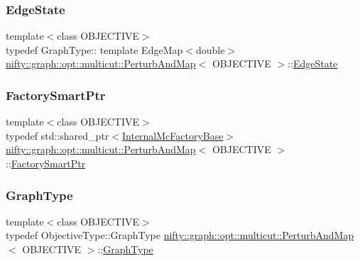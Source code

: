 \subsubsection{\texorpdfstring{Edge\+State}{EdgeState}}
{\footnotesize\ttfamily template$<$class O\+B\+J\+E\+C\+T\+I\+VE$>$ \\
typedef Graph\+Type\+:: template Edge\+Map$<$double$>$ \hyperlink{classnifty_1_1graph_1_1opt_1_1multicut_1_1PerturbAndMap}{nifty\+::graph\+::opt\+::multicut\+::\+Perturb\+And\+Map}$<$ O\+B\+J\+E\+C\+T\+I\+VE $>$\+::\hyperlink{classnifty_1_1graph_1_1opt_1_1multicut_1_1PerturbAndMap_a82a5b6a74aac0c8bc47d5ccfbd06aaf2}{Edge\+State}}

\mbox{\label{classnifty_1_1graph_1_1opt_1_1multicut_1_1PerturbAndMap_ac2849f0d5d528fb07bf62f213bee8551}} 
\subsubsection{\texorpdfstring{Factory\+Smart\+Ptr}{FactorySmartPtr}}
{\footnotesize\ttfamily template$<$class O\+B\+J\+E\+C\+T\+I\+VE$>$ \\
typedef std\+::shared\+\_\+ptr$<$\hyperlink{classnifty_1_1graph_1_1opt_1_1multicut_1_1PerturbAndMap_ae247bf7bd80c2621db557e828198b4f0}{Internal\+Mc\+Factory\+Base}$>$ \hyperlink{classnifty_1_1graph_1_1opt_1_1multicut_1_1PerturbAndMap}{nifty\+::graph\+::opt\+::multicut\+::\+Perturb\+And\+Map}$<$ O\+B\+J\+E\+C\+T\+I\+VE $>$\+::\hyperlink{classnifty_1_1graph_1_1opt_1_1multicut_1_1PerturbAndMap_ac2849f0d5d528fb07bf62f213bee8551}{Factory\+Smart\+Ptr}}

\mbox{\label{classnifty_1_1graph_1_1opt_1_1multicut_1_1PerturbAndMap_a4284b4d29c3e770b0e107fa794b3d32e}} 
\subsubsection{\texorpdfstring{Graph\+Type}{GraphType}}
{\footnotesize\ttfamily template$<$class O\+B\+J\+E\+C\+T\+I\+VE$>$ \\
typedef Objective\+Type\+::\+Graph\+Type \hyperlink{classnifty_1_1graph_1_1opt_1_1multicut_1_1PerturbAndMap}{nifty\+::graph\+::opt\+::multicut\+::\+Perturb\+And\+Map}$<$ O\+B\+J\+E\+C\+T\+I\+VE $>$\+::\hyperlink{classnifty_1_1graph_1_1opt_1_1multicut_1_1PerturbAndMap_a4284b4d29c3e770b0e107fa794b3d32e}{Graph\+Type}}

